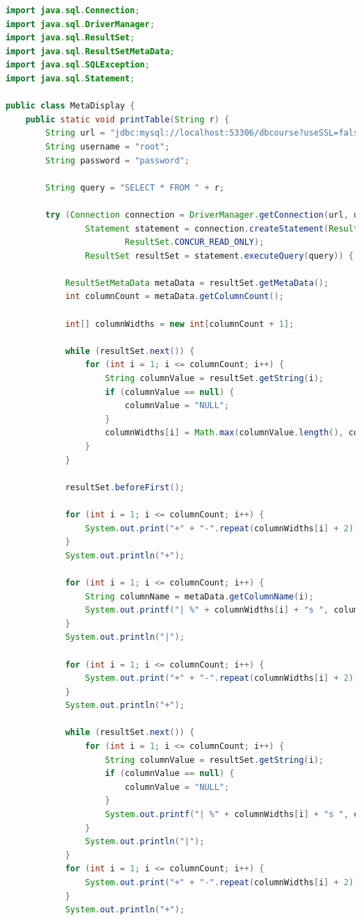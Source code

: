\documentclass{article}
\begin{document}
\begin{lstlisting}[language=java]
import java.sql.Connection;
import java.sql.DriverManager;
import java.sql.ResultSet;
import java.sql.ResultSetMetaData;
import java.sql.SQLException;
import java.sql.Statement;

public class MetaDisplay {
    public static void printTable(String r) {
        String url = "jdbc:mysql://localhost:53306/dbcourse?useSSL=false&allowPublicKeyRetrieval=true";
        String username = "root";
        String password = "password";

        String query = "SELECT * FROM " + r;

        try (Connection connection = DriverManager.getConnection(url, username, password);
                Statement statement = connection.createStatement(ResultSet.TYPE_SCROLL_INSENSITIVE,
                        ResultSet.CONCUR_READ_ONLY);
                ResultSet resultSet = statement.executeQuery(query)) {

            ResultSetMetaData metaData = resultSet.getMetaData();
            int columnCount = metaData.getColumnCount();

            int[] columnWidths = new int[columnCount + 1];

            while (resultSet.next()) {
                for (int i = 1; i <= columnCount; i++) {
                    String columnValue = resultSet.getString(i);
                    if (columnValue == null) {
                        columnValue = "NULL";
                    }
                    columnWidths[i] = Math.max(columnValue.length(), columnWidths[i]);
                }
            }

            resultSet.beforeFirst();

            for (int i = 1; i <= columnCount; i++) {
                System.out.print("+" + "-".repeat(columnWidths[i] + 2));
            }
            System.out.println("+");

            for (int i = 1; i <= columnCount; i++) {
                String columnName = metaData.getColumnName(i);
                System.out.printf("| %" + columnWidths[i] + "s ", columnName);
            }
            System.out.println("|");

            for (int i = 1; i <= columnCount; i++) {
                System.out.print("+" + "-".repeat(columnWidths[i] + 2));
            }
            System.out.println("+");

            while (resultSet.next()) {
                for (int i = 1; i <= columnCount; i++) {
                    String columnValue = resultSet.getString(i);
                    if (columnValue == null) {
                        columnValue = "NULL";
                    }
                    System.out.printf("| %" + columnWidths[i] + "s ", columnValue);
                }
                System.out.println("|");
            }
            for (int i = 1; i <= columnCount; i++) {
                System.out.print("+" + "-".repeat(columnWidths[i] + 2));
            }
            System.out.println("+");


\end{lstlisting}
\end{document}

